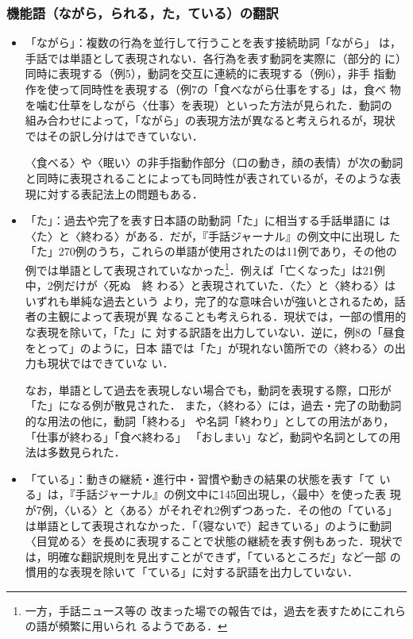 \documentclass[japanese]{jnlp_1.4}
\begin{document}
\subsubsection{機能語（ながら，られる，た，ている）の翻訳}
\begin{itemize}
\item 「ながら」：複数の行為を並行して行うことを表す接続助詞「ながら」
  は，手話では単語として表現されない．各行為を表す動詞を実際に（部分的
  に）同時に表現する（例5），動詞を交互に連続的に表現する（例6），非手
  指動作を使って同時性を表現する（例7の「食べながら仕事をする」は，食べ
  物を噛む仕草をしながら〈仕事〉を表現）といった方法が見られた．動詞の
  組み合わせによって，「ながら」の表現方法が異なると考えられるが，現状
  ではその訳し分けはできていない．

  〈食べる〉や〈眠い〉の非手指動作部分（口の動き，顔の表情）が次の動詞
  と同時に表現されることによっても同時性が表されているが，そのような表
  現に対する表記法上の問題もある．


\item 「た」：過去や完了を表す日本語の助動詞「た」に相当する手話単語に
  は〈た〉と〈終わる〉がある．だが，『手話ジャーナル』の例文中に出現し
  た「た」270例のうち，これらの単語が使用されたのは11例であり，その他の
  例では単語として表現されていなかった\footnote{一方，手話ニュース等の
    改まった場での報告では，過去を表すためにこれらの語が頻繁に用いられ
    るようである．}．例えば「亡くなった」は21例中，2例だけが〈死ぬ　終
  わる〉と表現されていた．〈た〉と〈終わる〉はいずれも単純な過去という
  より，完了的な意味合いが強いとされるため，話者の主観によって表現が異
  なることも考えられる．現状では，一部の慣用的な表現を除いて，「た」に
  対する訳語を出力していない．逆に，例8の「昼食をとって」のように，日本
  語では「た」が現れない箇所での〈終わる〉の出力も現状ではできていな
  い．

  なお，単語として過去を表現しない場合でも，動詞を表現する際，口形が
  「た」になる例が散見された．
  また，〈終わる〉には，過去・完了の助動詞的な用法の他に，動詞「終わる」
  や名詞「終わり」としての用法があり，「仕事が終わる」「食べ終わる」
  「おしまい」など，動詞や名詞としての用法は多数見られた．

\item 「ている」：動きの継続・進行中・習慣や動きの結果の状態を表す「て
  いる」は，『手話ジャーナル』の例文中に145回出現し，〈最中〉を使った表
  現が7例，〈いる〉と〈ある〉がそれぞれ2例ずつあった．その他の「ている」
  は単語として表現されなかった．「（寝ないで）起きている」のように動詞
  〈目覚める〉を長めに表現することで状態の継続を表す例もあった．現状で
  は，明確な翻訳規則を見出すことができず，「ているところだ」など一部
  の慣用的な表現を除いて「ている」に対する訳語を出力していない．


\end{itemize}
\end{document}
